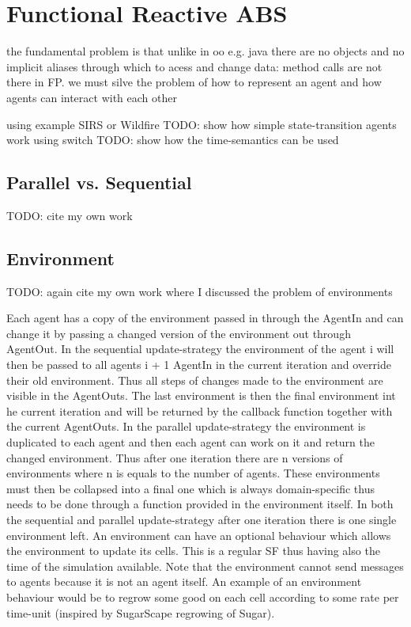 \section{Functional Reactive ABS}
the fundamental problem is that unlike in oo e.g. java there are no objects and no implicit aliases through which to acess and change data: method calls are not there in FP. we must silve the problem of how to represent an agent and how agents can interact with each other

using example SIRS or Wildfire
TODO: show how simple state-transition agents work using switch
TODO: show how the time-semantics can be used

\subsection{Parallel vs. Sequential}
TODO: cite my own work

\subsection{Environment}
TODO: again cite my own work where I discussed the problem of environments

Each agent has a copy of the environment passed in through the AgentIn and can change it by passing a changed version of the environment out through AgentOut. 
In the sequential update-strategy the environment of the agent i will then be passed to all agents i + 1 AgentIn in the current iteration and override their old environment. Thus all steps of changes made to the environment are visible in the AgentOuts. The last environment is then the final environment int he current iteration and will be returned by the callback function together with the current AgentOuts.
In the parallel update-strategy the environment is duplicated to each agent and then each agent can work on it and return the changed environment. Thus after one iteration there are n versions of environments where n is equals to the number of agents. These environments must then be collapsed into a final one which is always domain-specific thus needs to be done through a function provided in the environment itself.
In both the sequential and parallel update-strategy after one iteration there is one single environment left. An environment can have an optional behaviour which allows the environment to update its cells. This is a regular SF thus having also the time of the simulation available. Note that the environment cannot send messages to agents because it is not an agent itself. An example of an environment behaviour would be to regrow some good on each cell according to some rate per time-unit (inspired by SugarScape regrowing of Sugar).


